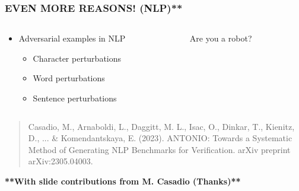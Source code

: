 \documentclass[t,compress,aspectratio=169]{beamer}
\begin{document}
\begin{frame}
\frametitle{EVEN MORE REASONS! (NLP)**}
\begin{columns}[c]
    \begin{column}{.5\textwidth}
    \Large

        \begin{itemize}
        \Large
            \item {Adversarial examples in NLP}
            \begin{itemize}
                    \Large

                \item Character perturbations
                \item Word perturbations
                \item Sentence perturbations
            \end{itemize}
        \end{itemize}

    \end{column}
    \begin{column}{.5\textwidth}
    \Large

    \begin{center}
        \textcolor{aisecpurple}{Are you a robot?}\\
    \end{center}
    \end{column}
\end{columns}
\vfill
	\begin{quote}
		\tiny Casadio, M., {{Arnaboldi, L.}}, Daggitt, M. L., Isac, O., Dinkar, T., Kienitz, D., ... \& Komendantskaya, E. (2023). ANTONIO: Towards a Systematic Method of Generating NLP Benchmarks for Verification. arXiv preprint arXiv:2305.04003.

	\end{quote}
 \vfill
 \tiny {\textbf{**With slide contributions from M. Casadio (Thanks)**}}
\end{frame}
\end{document}
